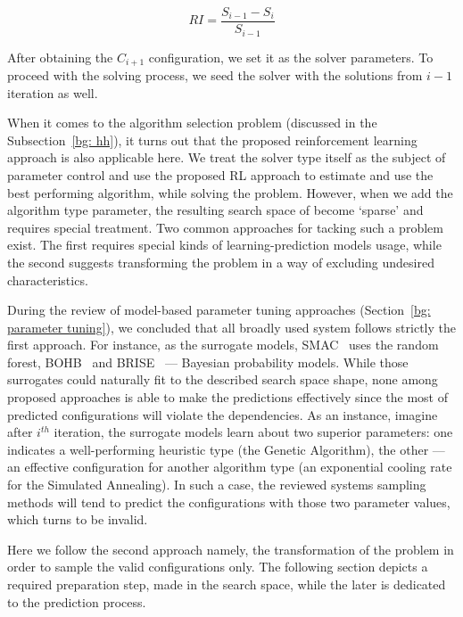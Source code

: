 \begin{equation}
RI = \frac{S_{i-1} - S_{i}}{S_{i-1}}
\label{concept: RI formula}
\end{equation}

After obtaining the $C_{i+1}$ configuration, we set it as the solver parameters. To proceed with the solving process, we seed the solver with the solutions from $i-1$ iteration as well.

When it comes to the algorithm selection problem (discussed in the Subsection~\ref{bg: hh}), it turns out that the proposed reinforcement learning approach is also applicable here. We treat the solver type itself as the subject of parameter control and use the proposed RL approach to estimate and use the best performing algorithm, while solving the problem. However, when we add the algorithm type parameter, the resulting search space of become `sparse' and requires special treatment. Two common approaches for tacking such a problem exist. The first requires special kinds of learning-prediction models usage, while the second suggests transforming the problem in a way of excluding undesired characteristics.

During the review of model-based parameter tuning approaches (Section~\ref{bg: parameter tuning}), we concluded that all broadly used system follows strictly the first approach. For instance, as the surrogate models, SMAC~\cite{hutter2011sequential} uses the random forest, BOHB~\cite{falkner2018bohb} and BRISE~\cite{brise2spl} — Bayesian probability models. While those surrogates could naturally fit to the described search space shape, none among proposed approaches is able to make the predictions effectively since the most of predicted configurations will violate the dependencies. As an instance, imagine after $i^{th}$ iteration, the surrogate models learn about two superior parameters: one indicates a well-performing heuristic type (the Genetic Algorithm), the other — an effective configuration for another algorithm type (an exponential cooling rate for the Simulated Annealing). In such a case, the reviewed systems sampling methods will tend to predict the configurations with those two parameter values, which turns to be invalid.

Here we follow the second approach namely, the transformation of the problem in order to sample the valid configurations only. The following section depicts a required preparation step, made in the search space, while the later is dedicated to the prediction process.


